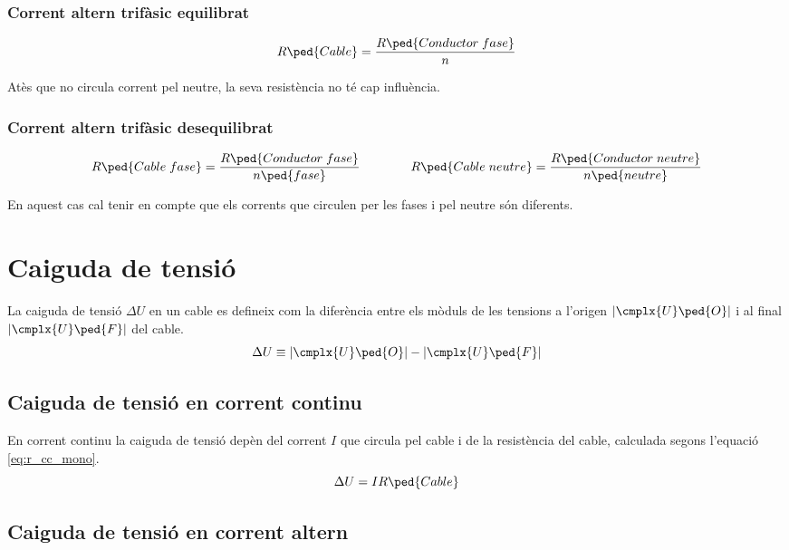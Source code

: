 \subsubsection*{Corrent altern trifàsic equilibrat}
\vspace{-5mm}
\begin{equation}\label{eq:r_trifas}
R\ped{Cable} = \frac{R\ped{Conductor\;fase}}{n}
\end{equation}

Atès que no circula corrent pel neutre, la seva resistència no  té cap influència.

\subsubsection*{Corrent altern trifàsic desequilibrat}
\begin{equation}
    R\ped{Cable\;fase} = \frac{R\ped{Conductor\;fase}}{n\ped{fase}} \qquad\qquad
    R\ped{Cable\; neutre} = \frac{R\ped{Conductor\;neutre}}{n\ped{neutre}}
\end{equation}

En aquest cas cal tenir en compte que els corrents que circulen per les fases i pel neutre
són diferents.


\section{Caiguda de tensió}

La caiguda de tensió $\Delta U$ en un cable es defineix com la diferència entre els mòduls de les tensions a l'origen $|{\cmplx{U}\ped{O}}|$ i al final $|\cmplx{U}\ped{F}|$ del cable.
\begin{equation}
   \Delta U \equiv |\cmplx{U}\ped{O}| - |\cmplx{U}\ped{F}|
\end{equation}

\subsection{Caiguda de tensió en corrent continu}

En corrent continu la caiguda de tensió depèn del corrent $I$ que circula pel cable i de la  resistència del  cable, calculada segons l'equació \eqref{eq:r_cc_mono}.
\begin{equation}
   \Delta U = I R\ped{Cable}
\end{equation}

\subsection{Caiguda de tensió en corrent altern}

